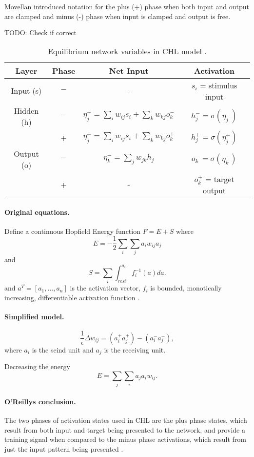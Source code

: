 Movellan introduced notation for the plus (+) phase when both input and output are clamped and minus (-) phase when input is clamped and output is free. 

TODO: Check if correct 
\begin{table}
  \centering
  \begin{tabular}{|cccc|}
    \hline
    Layer & Phase & Net Input & Activation\\
    \hline
    Input (s)    & $-$ & - & $s_i$ = stimulus input\\
    \hline
    Hidden (h)   & $-$ & \hspace{0.3cm}$\eta^{-}_j = \sum_i w_{ij}s_i + \sum_k w_{kj}o^{-}_k$\hspace{0.3cm} &
    $h^{-}_j = \sigma(\eta^{-}_j)$\hspace{0.3cm}\\
          &  +  & $\eta^{+}_j = \sum_{i}w_{ij}s_i + \sum_k w_{kj}o^{+}_k$ & $h^{+}_{j} = \sigma(\eta^{+}_j)$ \\
    \hline
    Output (o) & $-$ & $\eta^{-}_k = \sum_j w_{jk}h_j$ & $o^{-}_k = \sigma(\eta^{-}_k)$\\
           &  +  & - & $o^{+}_k$ = target output \\
    \hline
  \end{tabular}
  \caption{Equilibrium network variables in CHL model \citep{movellan1990contrastive}.}
  \label{tab:chl-states}
\end{table}

\paragraph{Original equations.}
Define a continuous Hopfield Energy function $F = E + S$ where
$$ E = -\frac{1}{2}\sum_i\sum_ja_iw_{ij}a_j$$
and 
$$ S = \sum_i \int_{rest}^{a_i} f_i^{-1}(a)da.$$
and $a^T = [a_1,\ldots,a_n]$ is the activation vector, $f_i$ is bounded, monotically increasing, differentiable activation function \citep{movellan1990contrastive}.

\paragraph{Simplified model.}

$$\frac{1}{\epsilon}\Delta w_{ij} = (a_i^+a_j^+)-(a_i^-a_j^-),$$
where $a_i$ is the seind unit and $a_j$ is the receiving unit. 

Decreasing the energy
$$E = \sum_j\sum_i a_j a_i w_{ij}.$$

\paragraph{O'Reillys conclusion.}

The two phases of activation states used in CHL are the plus phase states, which result from both input
and target being presented to the network, and provide a training signal when compared to the minus phase
activations, which result from just the input pattern being presented \citet{o1996bio}. 

